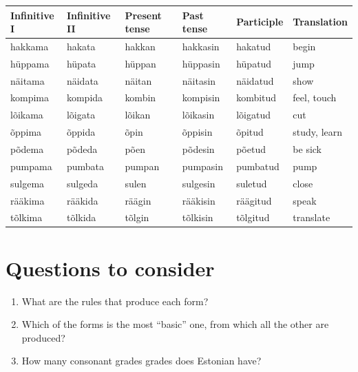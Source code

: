 \documentclass[a4paper, 12pt]{article}
\begin{document}
\begin{table}[H]
\begin{tabular}{llllll}
\toprule
\textbf{Infinitive I} & \textbf{Infinitive II} & \textbf{Present tense} & \textbf{Past tense} & \textbf{Participle} & \textbf{Translation} \\
\midrule
hakkama               & hakata                 & hakkan                 & hakkasin            & hakatud             & begin                \\
\addlinespace[0.2cm]
hüppama               & hüpata                 & hüppan                 & hüppasin            & hüpatud             & jump                 \\
\addlinespace[0.2cm]
näitama               & näidata                & näitan                 & näitasin            & näidatud            & show                 \\
\addlinespace[0.2cm]
kompima               & kompida                & kombin                 & kompisin            & kombitud            & feel, touch          \\
\addlinespace[0.2cm]
lõikama               & lõigata                & lõikan                 & lõikasin            & lõigatud            & cut                  \\
\addlinespace[0.2cm]
õppima                & õppida                 & õpin                   & õppisin             & õpitud              & study, learn         \\
\addlinespace[0.2cm]
põdema                & põdeda                 & põen                   & põdesin             & põetud              & be sick              \\
\addlinespace[0.2cm]
pumpama               & pumbata                & pumpan                 & pumpasin            & pumbatud            & pump                 \\
\addlinespace[0.2cm]
sulgema               & sulgeda                & sulen                  & sulgesin            & suletud             & close                \\
\addlinespace[0.2cm]
rääkima               & rääkida                & räägin                 & rääkisin            & räägitud            & speak                \\
\addlinespace[0.2cm]
tõlkima               & tõlkida                & tõlgin                 & tõlkisin            & tõlgitud            & translate           \\
\bottomrule
\end{tabular}
\end{table}

	\section{Questions to consider}
	
\begin{enumerate}[$\gg$]
	\item What are the rules that produce each form?
	\item Which of the forms is the most ``basic'' one, from which all the other are produced? 
	\item How many consonant grades grades does Estonian have?
\end{enumerate}

\printbibliography
\end{document}
